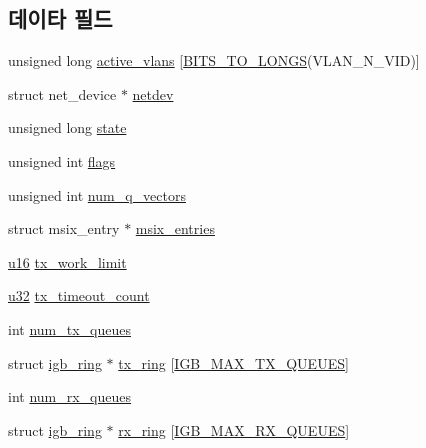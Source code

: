 \subsection*{데이타 필드}
\begin{DoxyCompactItemize}
\item 
unsigned long \hyperlink{structigb__adapter_acb1f06f1c2bb78264a0e21e01633e869}{active\+\_\+vlans} \mbox{[}\hyperlink{kcompat_8h_a950b68fa1f1dd2a638cc166d81394c6d}{B\+I\+T\+S\+\_\+\+T\+O\+\_\+\+L\+O\+N\+GS}(V\+L\+A\+N\+\_\+\+N\+\_\+\+V\+ID)\mbox{]}
\item 
struct net\+\_\+device $\ast$ \hyperlink{structigb__adapter_a5b3eca5b24cb88421c27369d02ebe884}{netdev}
\item 
unsigned long \hyperlink{structigb__adapter_af7504fc0e249186b115eb5f51a297878}{state}
\item 
unsigned int \hyperlink{structigb__adapter_ac92588540e8c1d014a08cd8a45462b19}{flags}
\item 
unsigned int \hyperlink{structigb__adapter_a08d3d8f70cc7a1c49d1fe95041877238}{num\+\_\+q\+\_\+vectors}
\item 
struct msix\+\_\+entry $\ast$ \hyperlink{structigb__adapter_abfef94b7ce9785066c5cdc6c4afbf045}{msix\+\_\+entries}
\item 
\hyperlink{lib_2igb_2e1000__osdep_8h_acdc9cf0314be0ae5a01d6d4379a95edd}{u16} \hyperlink{structigb__adapter_a38160b23e340e85491e8e4e90facc386}{tx\+\_\+work\+\_\+limit}
\item 
\hyperlink{lib_2igb_2e1000__osdep_8h_a64e91c10a0d8fb627e92932050284264}{u32} \hyperlink{structigb__adapter_a8b4aa773f6fd0df2ade5d5f231279c5f}{tx\+\_\+timeout\+\_\+count}
\item 
int \hyperlink{structigb__adapter_ae32ed07b6dc31b3af2218c468eae8578}{num\+\_\+tx\+\_\+queues}
\item 
struct \hyperlink{structigb__ring}{igb\+\_\+ring} $\ast$ \hyperlink{structigb__adapter_ae1c0ae9a78e113fa4a71c227dd155cd2}{tx\+\_\+ring} \mbox{[}\hyperlink{kmod_2igb_2igb_8h_a998f8863e2cbe39ec7adb6b8a9f7dc22}{I\+G\+B\+\_\+\+M\+A\+X\+\_\+\+T\+X\+\_\+\+Q\+U\+E\+U\+ES}\mbox{]}
\item 
int \hyperlink{structigb__adapter_a8f87d5fa7b4dc32f72e10934549f161f}{num\+\_\+rx\+\_\+queues}
\item 
struct \hyperlink{structigb__ring}{igb\+\_\+ring} $\ast$ \hyperlink{structigb__adapter_aba41465c4e7dcc3ba920c19a2d732ed5}{rx\+\_\+ring} \mbox{[}\hyperlink{kmod_2igb_2igb_8h_a7cdda9845bc93862004a8acdefed0075}{I\+G\+B\+\_\+\+M\+A\+X\+\_\+\+R\+X\+\_\+\+Q\+U\+E\+U\+ES}\mbox{]}

\end{DoxyCompactItemize}
